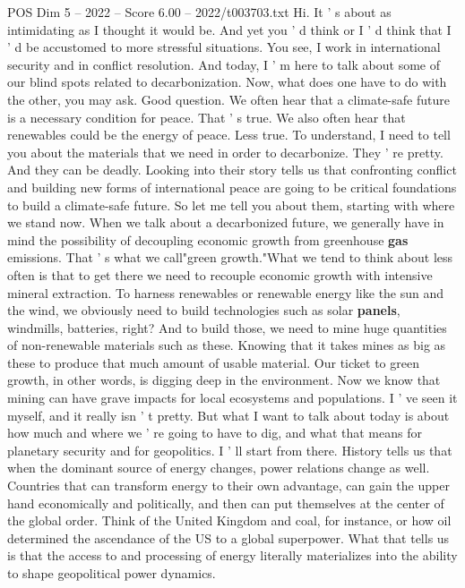 \begin{textsample}{POS Dim 5 – 2022 – Score 6.00 – 2022/t003703.txt}  \label{ex:f5_pos_048}
Hi.
It ' s about as intimidating as I thought it would be.
And yet you ' d think or I ' d think that I ' d be accustomed to more stressful situations.
You see, I work in international security and in conflict resolution.
And today, I ' m here to talk about some of our blind spots related to decarbonization.
Now, what does one have to do with the other, you may ask.
Good question.
We often hear that a climate-safe future is a necessary condition for peace.
That ' s true.
We also often hear that renewables could be the energy of peace.
Less true.
To understand, I need to tell you about the materials that we need in order to decarbonize.
They ' re pretty.
And they can be deadly.
Looking into their story tells us that confronting conflict and building new forms of international peace are going to be critical foundations to build a climate-safe future.
So let me tell you about them, starting with where we stand now.
When we talk about a decarbonized future, we generally have in mind the possibility of decoupling economic growth from greenhouse \textbf{gas} emissions.
That ' s what we call"green growth."What we tend to think about less often is that to get there we need to recouple economic growth with intensive mineral extraction.
To harness renewables or renewable energy like the sun and the wind, we obviously need to build technologies such as solar \textbf{panels}, windmills, batteries, right?
And to build those, we need to mine huge quantities of non-renewable materials such as these.
Knowing that it takes mines as big as these to produce that much amount of usable material.
Our ticket to green growth, in other words, is digging deep in the environment.
Now we know that mining can have grave impacts for local ecosystems and populations.
I ' ve seen it myself, and it really isn ' t pretty.
But what I want to talk about today is about how much and where we ' re going to have to dig, and what that means for planetary security and for geopolitics.
I ' ll start from there.
History tells us that when the dominant source of energy changes, power relations change as well.
Countries that can transform energy to their own advantage, can gain the upper hand economically and politically, and then can put themselves at the center of the global order.
Think of the United Kingdom and coal, for instance, or how oil determined the ascendance of the US to a global superpower.
What that tells us is that the access to and processing of energy literally materializes into the ability to shape geopolitical power dynamics.

\end{textsample}
